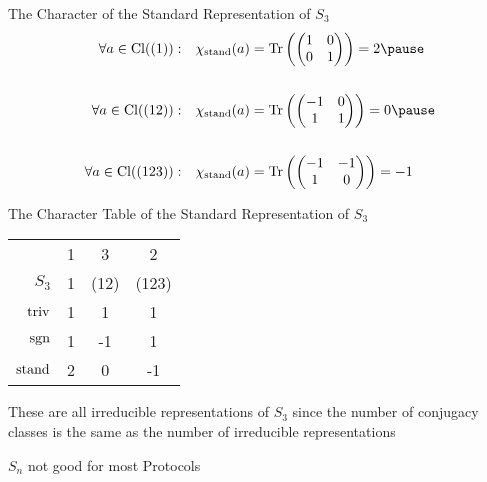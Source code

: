 \begin{frame}{The Character of the Standard Representation of $S_3$}
    \large
   \begin{align*}
    \forall a \in \Cl((1)): \quad & \chi_{\stand}(a) = \Tr\left(
        \begin{pmatrix}
            1 & 0 \\
            0 & 1
        \end{pmatrix}
    \right) = 2 \pause \\\\
    \forall a \in \Cl((12)): \quad & \chi_{\stand}(a) = \Tr\left(
        \begin{pmatrix}
            -1 & 0 \\
            1 & 1
        \end{pmatrix}
    \right) = 0 \pause \\\\
    \forall a \in \Cl((123)): \quad & \chi_{\stand}(a) = \Tr\left(
        \begin{pmatrix}
            -1 & -1 \\
            1 & 0
        \end{pmatrix}
    \right) = -1
   \end{align*} 
\end{frame}

\begin{frame}{The Character Table of the Standard Representation of $S_3$}
    \large
    \begin{center}
        \begin{tabular}{r | c  c  c}
                        & 1 & 3     & 2     \\
            $S_3$       & 1 & (12)  & (123) \\ \hline \pause
            $\operatorname{triv}$     & 1 & 1     & 1     \\ \pause
            $\operatorname{sgn}$      & 1 & -1    & 1     \\ \pause
            $\operatorname{stand}$    & 2 & 0     & -1
        \end{tabular}
    \end{center}
    
    \pause
    \vspace{2em}
    These are all irreducible representations of $S_3$ since the number of conjugacy classes is the same as the number of irreducible representations

\end{frame}

\begin{frame}{$S_n$ not good for most Protocols}
\end{frame}
